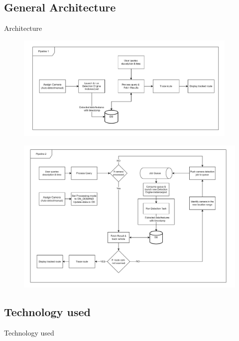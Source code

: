 \documentclass{beamer}
\begin{document}

\subsection{General Architecture}
\begin{frame}[allowframebreaks]{Architecture}
	\begin{figure}
		\includegraphics[width=0.95\textwidth]{res/pipeline1.png}
	\end{figure}
	\begin{figure}
		\includegraphics[height=0.8\textheight]{res/pipeline2.png}
	\end{figure}
\end{frame}

\subsection{Technology used}
\begin{frame}{Technology used}
\end{frame}
\end{document}
